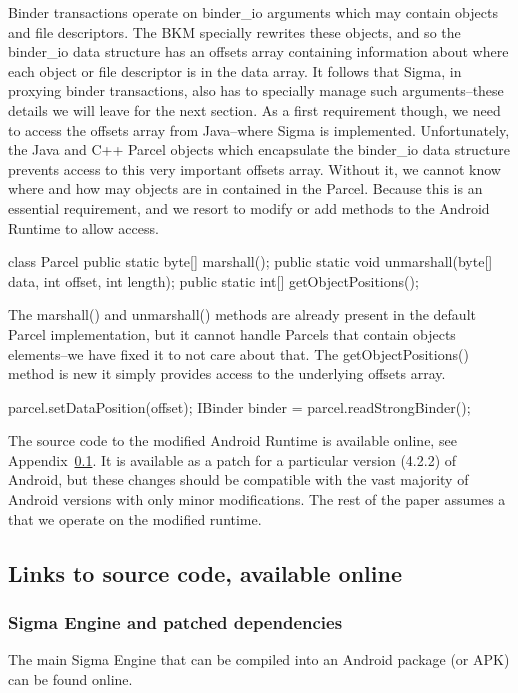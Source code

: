 \documentclass[prodmode]{acmlarge}
\begin{document}
Binder transactions operate on binder\_io arguments which may contain objects and file descriptors. The BKM specially rewrites these objects, and so the binder\_io data structure has an offsets array containing information about where each object or file descriptor is in the data array. It follows that Sigma, in proxying binder transactions, also has to specially manage such arguments--these details we will leave for the next section. As a first requirement though, we need to access the offsets array from Java--where Sigma is implemented. Unfortunately, the Java and C++ Parcel objects which encapsulate the binder\_io data structure prevents access to this very important offsets array. Without it, we cannot know where and how may objects are in contained in the Parcel. Because this is an essential requirement, and we resort to modify or add methods to the Android Runtime to allow access.

\begin{snippet}
class Parcel {
  public static byte[] marshall();
  public static void unmarshall(byte[] data, int offset, int length);
  public static int[] getObjectPositions();
}
\end{snippet}

The marshall() and unmarshall() methods are already present in the default Parcel implementation, but it cannot handle Parcels that contain objects elements--we have fixed it to not care about that. The getObjectPositions() method is new it simply provides access to the underlying offsets array.

\begin{snippet}
parcel.setDataPosition(offset);
IBinder binder = parcel.readStrongBinder();
\end{snippet}

The source code to the modified Android Runtime is available online, see Appendix~\ref{app:SourceCode}. It is available as a patch for a particular version (4.2.2) of Android, but these changes should be compatible with the vast majority of Android versions with only minor modifications. The rest of the paper assumes a that we operate on the modified runtime.

\subsection{Links to source code, available online}
\label{app:SourceCode}

\subsubsection{Sigma Engine and patched dependencies}
The main Sigma Engine that can be compiled into an Android package (or APK) can be found online.
\end{document}
